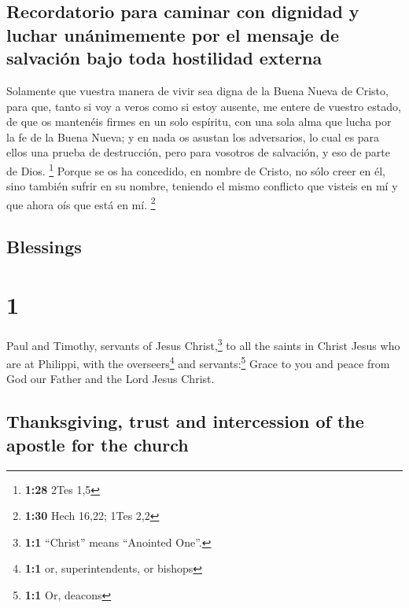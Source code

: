 \begin{paracol}{2}
\hypertarget{recordatorio-para-caminar-con-dignidad-y-luchar-unuxe1nimemente-por-el-mensaje-de-salvaciuxf3n-bajo-toda-hostilidad-externa}{%
\subsection{Recordatorio para caminar con dignidad y luchar unánimemente
por el mensaje de salvación bajo toda hostilidad
externa}\label{recordatorio-para-caminar-con-dignidad-y-luchar-unuxe1nimemente-por-el-mensaje-de-salvaciuxf3n-bajo-toda-hostilidad-externa}}

 Solamente que vuestra manera de vivir sea digna de la
Buena Nueva de Cristo, para que, tanto si voy a veros como si estoy
ausente, me entere de vuestro estado, de que os mantenéis firmes en un
solo espíritu, con una sola alma que lucha por la fe de la Buena Nueva;
 y en nada os asustan los adversarios, lo cual es para
ellos una prueba de destrucción, pero para vosotros de salvación, y eso
de parte de Dios. \footnote{\textbf{1:28} 2Tes 1,5} 
Porque se os ha concedido, en nombre de Cristo, no sólo creer en él,
sino también sufrir en su nombre,  teniendo el mismo
conflicto que visteis en mí y que ahora oís que está en mí. \footnote{\textbf{1:30}
  Hech 16,22; 1Tes 2,2}

\switchcolumn
\begin{otherlanguage}{english}

\hypertarget{blessings}{%
\subsection{Blessings}\label{blessings}}

\hypertarget{section-1}{%
\section{1}\label{section-1}}

 Paul and Timothy, servants of Jesus Christ,\footnote{\textbf{1:1}
  ``Christ'' means ``Anointed One''.} to all the saints in Christ Jesus
who are at Philippi, with the overseers\footnote{\textbf{1:1} or,
  superintendents, or bishops} and servants:\footnote{\textbf{1:1} Or,
  deacons}  Grace to you and peace from God our Father and
the Lord Jesus Christ.

\hypertarget{thanksgiving-trust-and-intercession-of-the-apostle-for-the-church}{%
\subsection{Thanksgiving, trust and intercession of the apostle for the
church}\label{thanksgiving-trust-and-intercession-of-the-apostle-for-the-church}}


\end{otherlanguage}
\end{paracol}
